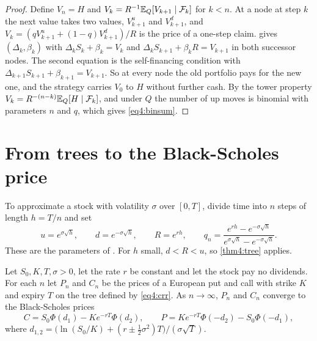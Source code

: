 \begin{chapterrefs}
\begin{proof}
Define $V_n=H$ and $V_k=R^{-1}\mathbb{E}_Q[V_{k+1}\mid\mathcal F_k]$ for $k<n$. At a node at step $k$ the next
value takes two values, $V_{k+1}^u$ and $V_{k+1}^d$, and $V_k=(qV_{k+1}^u+(1-q)V_{k+1}^d)/R$ is the price
of a one-step claim.  gives $(\Delta_k,\beta_k)$ with $\Delta_kS_k+\beta_k=V_k$ and
$\Delta_kS_{k+1}+\beta_kR=V_{k+1}$ in both successor nodes. The second equation is the self-financing
condition with $\Delta_{k+1}S_{k+1}+\beta_{k+1}=V_{k+1}$. So at every node the old portfolio pays for the new one, and the strategy carries $V_0$
to $H$ without further cash. By the tower property $V_k=R^{-(n-k)}\mathbb{E}_Q[H\mid\mathcal F_k]$, and under $Q$ the number of
up moves is binomial with parameters $n$ and $q$, which gives \cref{eq4:binsum}.
\end{proof}

\section{From trees to the Black-Scholes price}
\label{sec4:limit}

To approximate a stock with volatility $\sigma$ over $[0,T]$, divide time into $n$ steps of length
$h=T/n$ and set
\begin{equation}\label{eq4:crr}
  u=e^{\sigma\sqrt h},\qquad d=e^{-\sigma\sqrt h},\qquad R=e^{rh},\qquad q_n=\frac{e^{rh}-e^{-\sigma\sqrt h}}{e^{\sigma\sqrt h}-e^{-\sigma\sqrt h}} .
\end{equation}
These are the parameters of \textcite{cox1979}. For $h$ small, $d<R<u$, so \cref{thm4:tree} applies.

\begin{theorem}\label{thm4:crr}
Let $S_0,K,T,\sigma>0$, let the rate $r$ be constant and let the stock pay no dividends. For each $n$
let $P_n$ and $C_n$ be the prices of a European put and call with strike $K$ and expiry $T$ on the tree
defined by \eqref{eq4:crr}. As $n\to\infty$, $P_n$ and $C_n$ converge to the Black-Scholes prices
\begin{equation}\label{eq4:bs}
  C=S_0\Phi(d_1)-Ke^{-rT}\Phi(d_2),\qquad P=Ke^{-rT}\Phi(-d_2)-S_0\Phi(-d_1),
\end{equation}
where $d_{1,2}=\bigl(\ln(S_0/K)+(r\pm\tfrac12\sigma^2)T\bigr)/(\sigma\sqrt T)$.
\end{theorem}


\end{chapterrefs}
